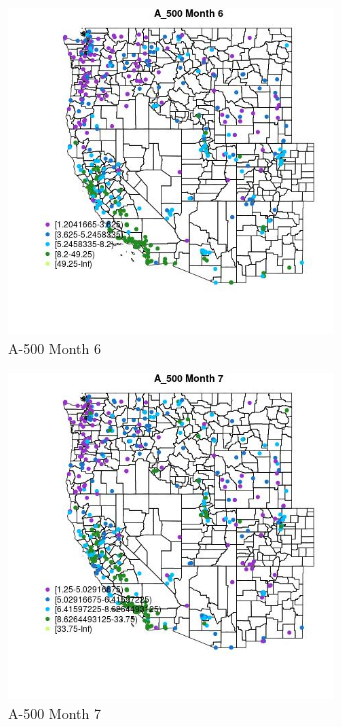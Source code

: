 \clearpage 

\begin{figure} 
\centering  
\includegraphics[width=0.77\textwidth]{Code_Outputs/ML_input_report_ML_input_PM25_Step5_part_d_de_duplicated_aves_ML_input_MapObsMo6A_500.jpg} 
\caption{\label{fig:ML_input_report_ML_input_PM25_Step5_part_d_de_duplicated_aves_ML_inputMapObsMo6A_500}A-500 Month 6} 
\end{figure} 
 

\begin{figure} 
\centering  
\includegraphics[width=0.77\textwidth]{Code_Outputs/ML_input_report_ML_input_PM25_Step5_part_d_de_duplicated_aves_ML_input_MapObsMo7A_500.jpg} 
\caption{\label{fig:ML_input_report_ML_input_PM25_Step5_part_d_de_duplicated_aves_ML_inputMapObsMo7A_500}A-500 Month 7} 
\end{figure} 
 

